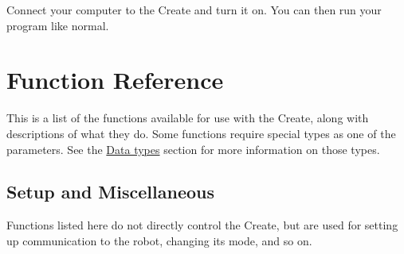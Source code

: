 \documentclass {article}
\begin{document}
\noindent Connect your computer to the Create and turn it on.  You can then run your program like
normal.

\newpage


\section {Function Reference}
\newcommand {\lng} {{\bf long\ }}
\newcommand {\short} {{\bf short\ }}
\newcommand {\cint} {{\bf int\ }}
\newcommand {\flt} {{\bf float\ }}
\newcommand {\dbl} {{\bf double\ }}
\newcommand {\cchar} {{\bf char\ }}
\newcommand {\fail} {{\tt INT\_MIN\ }}
%
\newcommand {\byte} {\hyperlink{oibyte}{{\bf byte\ }}}
\newcommand {\oiled} {\hyperlink{oiled}{{\bf oi\_led\ }}}
\newcommand {\oibaud} {\hyperlink{oibaud}{{\bf oi\_baud\ }}}
\newcommand {\oidemo} {\hyperlink{oidemo}{{\bf oi\_demo\ }}}
\newcommand {\oisensor} {\hyperlink{oisensor}{{\bf oi\_sensor\ }}}
\newcommand {\oicommand} {\hyperlink{oicommand}{{\bf oi\_command\ }}}
\newcommand {\oioutput} {\hyperlink{oioutput}{{\bf oi\_output\ }}}
%
\newcommand {\func}[2]{\hypertarget{#2}{{\tt #1}} \\}
\newcommand {\ret}[1] {{\bf Returns:} #1}
\newcommand {\retnorm} {{\bf Returns:} 0 on success or -1 on error}
\newenvironment {params}{{\bf Parameters:} \vspace{-9pt} \begin {quote} \begin {description}}
    {\end {description} \end {quote}}

This is a list of the functions available for use with the Create, along with descriptions of what
they do.  Some functions require special types as one of the parameters.  See the
\hyperlink{datatypes}{Data types} section for more information on those types.

\subsection {Setup and Miscellaneous}
Functions listed here do not directly control the Create, but are used for setting up communication
to the robot, changing its mode, and so on.
\end{document}
